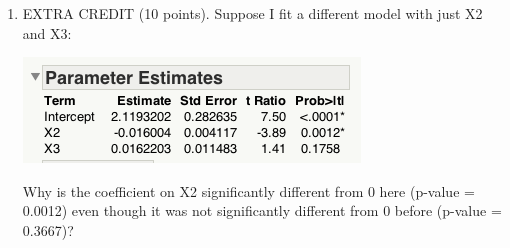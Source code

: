 \documentclass{article}\usepackage{graphicx, color}
\providecommand{\q}{$\quad$ \newline}
\numberwithin{equation}{section}
\begin{document}
\begin{flushleft}
\begin{enumerate}[1. ]
\item EXTRA CREDIT (10 points). Suppose I fit a different model with just X2 and X3:


\begin{center}
 \includegraphics{../../fig/riversparams2.png}
\end{center}

Why is the coefficient on X2 significantly different from 0 here (p-value = 0.0012) even though it was not significantly different from 0 before (p-value = 0.3667)?  \q




\end{enumerate}
\end{flushleft}
\end{document}
